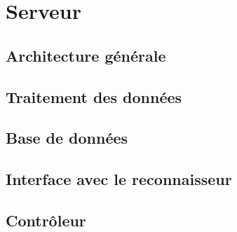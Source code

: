 \chapter{Serveur}

\section{Architecture générale}

\section{Traitement des données}

\section{Base de données}

\section{Interface avec le reconnaisseur}

\section{Contrôleur}
